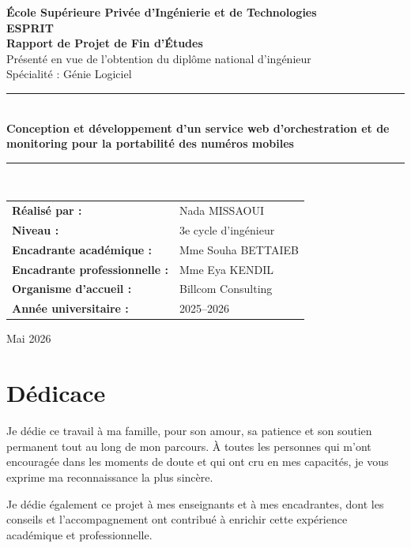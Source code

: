\documentclass[12pt,a4paper]{report}
\begin{document}
\begin{titlepage}
    \centering
    \vspace*{0.5cm}
    {\Large \textbf{École Supérieure Privée d'Ingénierie et de Technologies}}\\[0.2cm]
    {\Large \textbf{ESPRIT}}\\[1.5cm]

    {\Huge \textbf{Rapport de Projet de Fin d'Études}}\\[0.6cm]
    {\Large Présenté en vue de l'obtention du diplôme national d'ingénieur}\\[0.4cm]
    {\Large Spécialité : Génie Logiciel}\\[1.4cm]

    \rule{\textwidth}{0.8pt}\\[0.4cm]
    {\LARGE \textbf{Conception et développement d'un service web d'orchestration et de monitoring pour la portabilité des numéros mobiles}}\\[0.4cm]
    \rule{\textwidth}{0.8pt}\\[1.5cm]

    \begin{tabular}{>{\bfseries}p{5.2cm}p{8cm}}
        Réalisé par : & Nada MISSAOUI\\[0.35cm]
        Niveau : & 3e cycle d'ingénieur\\[0.35cm]
        Encadrante académique : & Mme Souha BETTAIEB\\[0.35cm]
        Encadrante professionnelle : & Mme Eya KENDIL\\[0.35cm]
        Organisme d'accueil : & Billcom Consulting\\[0.35cm]
        Année universitaire : & 2025--2026
    \end{tabular}

    \vfill
    {\large Mai 2026}
\end{titlepage}


\chapter*{Dédicace}
Je dédie ce travail à ma famille, pour son amour, sa patience et son soutien permanent tout au long de mon parcours. À toutes les personnes qui m'ont encouragée dans les moments de doute et qui ont cru en mes capacités, je vous exprime ma reconnaissance la plus sincère.

Je dédie également ce projet à mes enseignants et à mes encadrantes, dont les conseils et l'accompagnement ont contribué à enrichir cette expérience académique et professionnelle.
\end{document}
